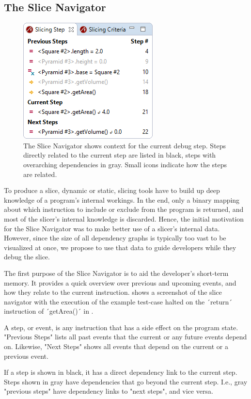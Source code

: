 \subsection{The Slice Navigator}

\begin{figure}
	\centering
		\includegraphics[width=0.40\linewidth]{img/slice1.png}
	\caption{The Slice Navigator shows context for the current debug step. Steps directly related to the current step are listed in black, steps with overarching dependencies in gray. Small icons indicate how the steps are related.}
	\label{fig:slice1}
\end{figure}

To produce a slice, dynamic or static, slicing tools have to build up deep knowledge of a program's internal workings.
In the end, only a binary mapping about which instruction to include or exclude from the program is returned, and most of the slicer's internal knowledge is discarded.
Hence, the initial motivation for the Slice Navigator was to make better use of a slicer's internal data.
However, since the size of all dependency graphs is typically too vast to be visualized at once, we propose to use that data to guide developers while they debug the slice.

The first purpose of the Slice Navigator is to aid the developer's short-term memory.
It provides a quick overview over previous and upcoming events, and how they relate to the current instruction.
 shows a screenshot of the slice navigator with the execution of the example test-case halted on the ´return´ instruction of ´getArea()´ in .

A step, or event, is any instruction that has a side effect on the program state.
"Previous Steps" lists all past events that the current or any future events depend on.
Likewise, "Next Steps" shows all events that depend on the current or a previous event.

If a step is shown in black, it has a direct dependency link to the current step.
Steps shown in gray have dependencies that go beyond the current step.
I.e., gray "previous steps" have dependency links to "next steps", and vice versa.

